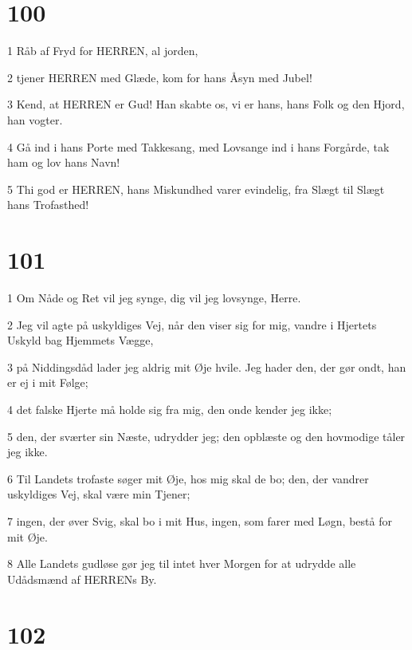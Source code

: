 \chapter{100}

\par 1 Råb af Fryd for HERREN, al jorden,
\par 2 tjener HERREN med Glæde, kom for hans Åsyn med Jubel!
\par 3 Kend, at HERREN er Gud! Han skabte os, vi er hans, hans Folk og den Hjord, han vogter.
\par 4 Gå ind i hans Porte med Takkesang, med Lovsange ind i hans Forgårde, tak ham og lov hans Navn!
\par 5 Thi god er HERREN, hans Miskundhed varer evindelig, fra Slægt til Slægt hans Trofasthed!

\chapter{101}

\par 1 Om Nåde og Ret vil jeg synge, dig vil jeg lovsynge, Herre.
\par 2 Jeg vil agte på uskyldiges Vej, når den viser sig for mig, vandre i Hjertets Uskyld bag Hjemmets Vægge,
\par 3 på Niddingsdåd lader jeg aldrig mit Øje hvile. Jeg hader den, der gør ondt, han er ej i mit Følge;
\par 4 det falske Hjerte må holde sig fra mig, den onde kender jeg ikke;
\par 5 den, der sværter sin Næste, udrydder jeg; den opblæste og den hovmodige tåler jeg ikke.
\par 6 Til Landets trofaste søger mit Øje, hos mig skal de bo; den, der vandrer uskyldiges Vej, skal være min Tjener;
\par 7 ingen, der øver Svig, skal bo i mit Hus, ingen, som farer med Løgn, bestå for mit Øje.
\par 8 Alle Landets gudløse gør jeg til intet hver Morgen for at udrydde alle Udådsmænd af HERRENs By.

\chapter{102}

